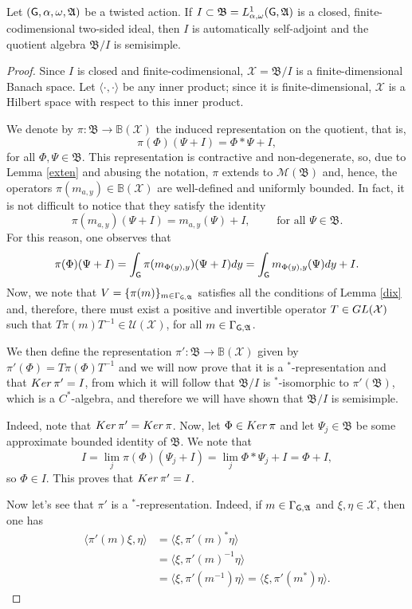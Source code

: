 \documentclass[10pt,a4paper]{amsart}
\def\G{{\sf G}}
\def\X{\mathcal{X}}
\def\d{{\rm d}}
\newcommand{\A}{\mathfrak{A}}
\newcommand{\B}{\mathfrak{B}}
\begin{document}
\begin{thm}\label{semisimplicity}
Let $(\G,\alpha,\omega,\A)$ be a twisted action. If $I\subset \B=L^1_{\alpha,\omega}(\G,\A)$ is a closed, finite-codimensional two-sided ideal, then $I$ is automatically self-adjoint and the quotient algebra $\B/I$ is semisimple.
\end{thm}

\begin{proof}
Since $I$ is closed and finite-codimensional, $\mathcal X=\B/I$ is a finite-dimensional Banach space. Let $\langle\cdot,\cdot\rangle$ be any inner product; since it is finite-dimensional, $\X$ is a Hilbert space with respect to this inner product.

We denote by $\pi:\B\to\mathbb B(\mathcal X)$ the induced representation on the quotient, that is, 
$$
\pi(\Phi)(\Psi+I)=\Phi*\Psi+I,
$$
for all $\Phi,\Psi\in \B$. This representation is contractive and non-degenerate, so, due to Lemma \ref{exten} and abusing the notation, $\pi$ extends to $\mathcal M(\B)$ and, hence, the operators $\pi(m_{a,y})\in\mathbb B(\X)$ are well-defined and uniformly bounded. In fact, it is not difficult to notice that they satisfy the identity
$$
\pi(m_{a,y})(\Psi+I)=m_{a,y}(\Psi)+I,\quad\quad\text{ for all }\Psi\in\B.
$$
For this reason, one observes that
\begin{equation}\label{desinte}
\pi(\Phi)(\Psi+I)=\int_\G \pi(m_{\Phi(y),y})(\Psi+I)\d y=\int_\G m_{\Phi(y),y}(\Psi)\d y +I.
\end{equation}
Now, we note that $V=\{\pi(m)\}_{m\in\Gamma_{\G,\A}}$ satisfies all the conditions of Lemma \ref{dix} and, therefore, there must exist a positive and invertible operator $T\in {\rm GL}(\X)$ such that $T\pi(m)T^{-1}\in \mathcal U(\X)$, for all ${m\in\Gamma_{\G,\A}}$.

We then define the representation $\pi':\B\to\mathbb B(\X)$ given by $\pi'(\Phi)=T\pi(\Phi)T^{-1}$ and we will now prove that it is a $^*$-representation and that ${\rm Ker}\,\pi'=I$, from which it will follow that $\B/I$ is $^*$-isomorphic to $\pi'(\B)$, which is a $C^*$-algebra, and therefore we will have shown that $\B/I$ is semisimple.

Indeed, note that ${\rm Ker}\,\pi'={\rm Ker}\,\pi$. Now, let $\Phi\in{\rm Ker}\,\pi$ and let $\Psi_j\in\B$ be some approximate bounded identity of $\B$. We note that
$$
I=\lim_j\pi(\Phi)(\Psi_j+I)=\lim_j \Phi*\Psi_j+I=\Phi+I,
$$ 
so $\Phi\in I$. This proves that ${\rm Ker}\,\pi'=I$.

Now let's see that $\pi'$ is a $^*$-representation. Indeed, if $m\in\Gamma_{\G,\A}$ and $\xi,\eta\in\X$, then one has 
\begin{align*}
    \langle \pi'(m)\xi,\eta\rangle&=\langle \xi,\pi'(m)^{*}\eta\rangle \\
    &=\langle \xi,\pi'(m)^{-1}\eta\rangle \\
    &=\langle \xi,\pi'(m^{-1})\eta\rangle=\langle \xi,\pi'(m^*)\eta\rangle.
\end{align*}


\end{proof}
\end{document}
